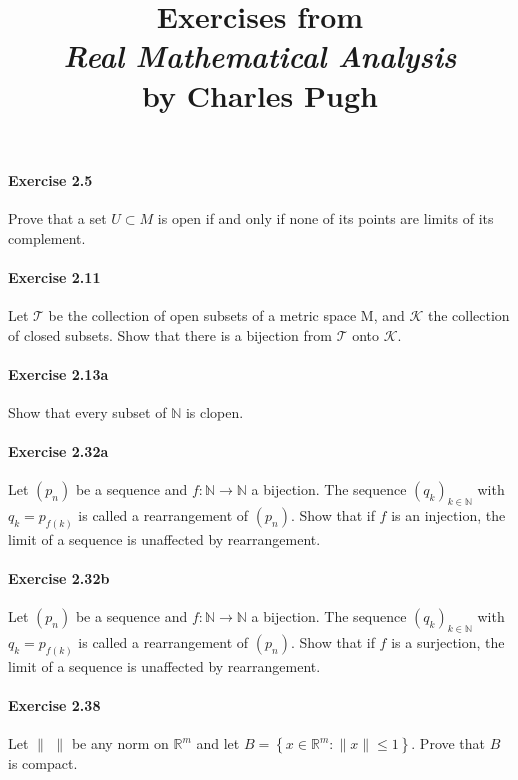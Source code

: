 \documentclass{article}
\title{\textbf{
Exercises from \\
\textit{Real Mathematical Analysis} \\
by Charles Pugh
}}
\date{}
\begin{document}
\maketitle

\paragraph{Exercise 2.5} Prove that a set $U \subset M$ is open if and only if none of its points are limits of its complement.

\paragraph{Exercise 2.11} Let $\mathcal{T}$ be the collection of open subsets of a metric space $\mathrm{M}$, and $\mathcal{K}$ the collection of closed subsets. Show that there is a bijection from $\mathcal{T}$ onto $\mathcal{K}$.

\paragraph{Exercise 2.13a} Show that every subset of $\mathbb{N}$ is clopen.

\paragraph{Exercise 2.32a} Let $(p_n)$ be a sequence and $f:\mathbb{N}\to\mathbb{N}$ a bijection. The sequence $(q_k)_{k\in\mathbb{N}}$ with $q_k=p_{f(k)}$ is called a rearrangement of $(p_n)$. Show that if $f$ is an injection, the limit of a sequence is unaffected by rearrangement.

\paragraph{Exercise 2.32b} Let $(p_n)$ be a sequence and $f:\mathbb{N}\to\mathbb{N}$ a bijection. The sequence $(q_k)_{k\in\mathbb{N}}$ with $q_k=p_{f(k)}$ is called a rearrangement of $(p_n)$. Show that if $f$ is a surjection, the limit of a sequence is unaffected by rearrangement.

\paragraph{Exercise 2.38} Let $\|\hspace{4pt}\|$ be any norm on $\mathbb{R}^{m}$ and let $B=\left\{x \in \mathbb{R}^{m}:\|x\| \leq 1\right\}$. Prove that $B$ is compact.
\end{document}
